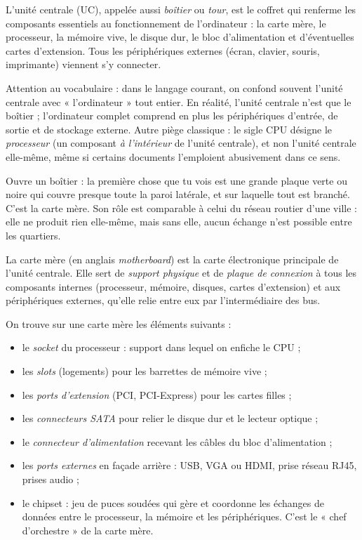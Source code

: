 \documentclass[11pt]{article}
\newcommand{\cle}[1]{{\popxbold\color{popdark}#1}}
\newcounter{popsec}
\newcounter{popsub}
\newcommand{\courssub}[1]{%
  \stepcounter{popsub}%
  \par\vspace{9pt}\noindent{\popxbold\fontsize{11.5}{13}\selectfont\color{popink}{\color{poporange}\thepopsec.\thepopsub}\hspace{6pt}#1}\par\nopagebreak\vspace{4pt}
}
\begin{document}
\begin{definition}
L'\cle{unité centrale} (UC), appelée aussi \emph{boîtier} ou \emph{tour}, est le coffret qui renferme les composants essentiels au fonctionnement de l'ordinateur : la carte mère, le processeur, la mémoire vive, le disque dur, le bloc d'alimentation et d'éventuelles cartes d'extension. Tous les périphériques externes (écran, clavier, souris, imprimante) viennent s'y connecter.
\end{definition}

Attention au vocabulaire : dans le langage courant, on confond souvent l'unité centrale avec « l'ordinateur » tout entier. En réalité, l'unité centrale n'est que le boîtier ; l'ordinateur complet comprend en plus les périphériques d'entrée, de sortie et de stockage externe. Autre piège classique : le sigle \cle{CPU} désigne le \emph{processeur} (un composant \emph{à l'intérieur} de l'unité centrale), et non l'unité centrale elle-même, même si certains documents l'emploient abusivement dans ce sens.

\courssub{La carte mère : la plaque de connexion}

Ouvre un boîtier : la première chose que tu vois est une grande plaque verte ou noire qui couvre presque toute la paroi latérale, et sur laquelle tout est branché. C'est la carte mère. Son rôle est comparable à celui du réseau routier d'une ville : elle ne produit rien elle-même, mais sans elle, aucun échange n'est possible entre les quartiers.

\begin{definition}
La \cle{carte mère} (en anglais \emph{motherboard}) est la carte électronique principale de l'unité centrale. Elle sert de \emph{support physique} et de \emph{plaque de connexion} à tous les composants internes (processeur, mémoire, disques, cartes d'extension) et aux périphériques externes, qu'elle relie entre eux par l'intermédiaire des bus.
\end{definition}

On trouve sur une carte mère les éléments suivants :

\begin{itemize}
\item le \emph{socket} du processeur : support dans lequel on enfiche le CPU ;
\item les \emph{slots} (logements) pour les barrettes de mémoire vive ;
\item les \emph{ports d'extension} (PCI, PCI-Express) pour les cartes filles ;
\item les \emph{connecteurs SATA} pour relier le disque dur et le lecteur optique ;
\item le \emph{connecteur d'alimentation} recevant les câbles du bloc d'alimentation ;
\item les \emph{ports externes} en façade arrière : USB, VGA ou HDMI, prise réseau RJ45, prises audio ;
\item le \cle{chipset} : jeu de puces soudées qui gère et coordonne les échanges de données entre le processeur, la mémoire et les périphériques. C'est le « chef d'orchestre » de la carte mère.
\end{itemize}
\end{document}
